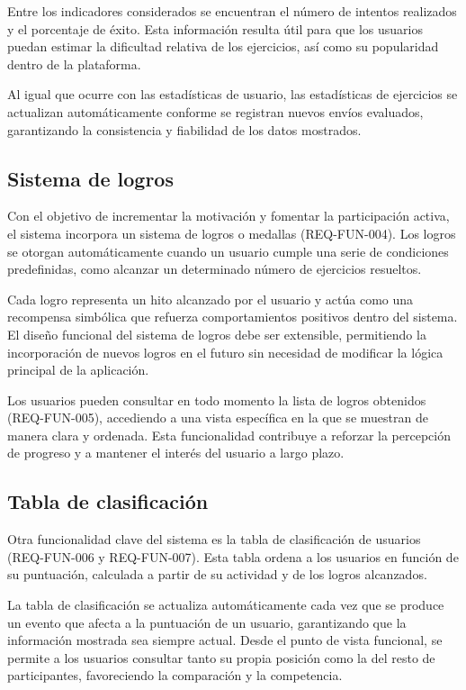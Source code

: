 Entre los indicadores considerados se encuentran el número de intentos realizados y el porcentaje de éxito. Esta información resulta útil para que los usuarios puedan estimar la dificultad relativa de los ejercicios, así como su popularidad dentro de la plataforma.

Al igual que ocurre con las estadísticas de usuario, las estadísticas de ejercicios se actualizan automáticamente conforme se registran nuevos envíos evaluados, garantizando la consistencia y fiabilidad de los datos mostrados.

\subsection{Sistema de logros}

Con el objetivo de incrementar la motivación y fomentar la participación activa, el sistema incorpora un sistema de logros o medallas (REQ-FUN-004). Los logros se otorgan automáticamente cuando un usuario cumple una serie de condiciones predefinidas, como alcanzar un determinado número de ejercicios resueltos.

Cada logro representa un hito alcanzado por el usuario y actúa como una recompensa simbólica que refuerza comportamientos positivos dentro del sistema. El diseño funcional del sistema de logros debe ser extensible, permitiendo la incorporación de nuevos logros en el futuro sin necesidad de modificar la lógica principal de la aplicación.

Los usuarios pueden consultar en todo momento la lista de logros obtenidos (REQ-FUN-005), accediendo a una vista específica en la que se muestran de manera clara y ordenada. Esta funcionalidad contribuye a reforzar la percepción de progreso y a mantener el interés del usuario a largo plazo.

\subsection{Tabla de clasificación}

Otra funcionalidad clave del sistema es la tabla de clasificación de usuarios (REQ-FUN-006 y REQ-FUN-007). Esta tabla ordena a los usuarios en función de su puntuación, calculada a partir de su actividad y de los logros alcanzados.

La tabla de clasificación se actualiza automáticamente cada vez que se produce un evento que afecta a la puntuación de un usuario, garantizando que la información mostrada sea siempre actual. Desde el punto de vista funcional, se permite a los usuarios consultar tanto su propia posición como la del resto de participantes, favoreciendo la comparación y la competencia.

